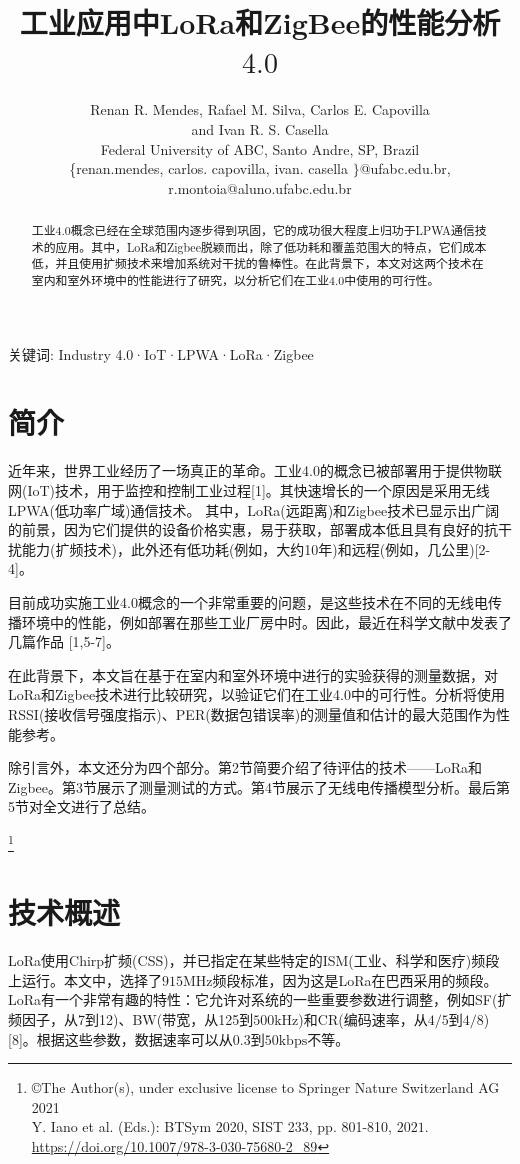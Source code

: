 \documentclass[10pt]{ctexart}
\title{工业应用中LoRa和ZigBee的性能分析 $4.0$ }
\author{Renan R. Mendes, Rafael M. Silva, Carlos E. Capovilla\\
and Ivan R. S. Casella \\
Federal University of ABC, Santo Andre, SP, Brazil\\
\{renan.mendes, carlos. capovilla, ivan. casella $\}$@ufabc.edu.br,\\
r.montoia@aluno.ufabc.edu.br}
\date{}
\begin{document}
\maketitle


\begin{abstract}
工业4.0概念已经在全球范围内逐步得到巩固，它的成功很大程度上归功于LPWA通信技术的应用。其中，LoRa和Zigbee脱颖而出，除了低功耗和覆盖范围大的特点，它们成本低，并且使用扩频技术来增加系统对干扰的鲁棒性。在此背景下，本文对这两个技术在室内和室外环境中的性能进行了研究，以分析它们在工业4.0中使用的可行性。
\end{abstract}

关键词: Industry 4.0·IoT·LPWA·LoRa·Zigbee

\section{简介}
近年来，世界工业经历了一场真正的革命。工业4.0的概念已被部署用于提供物联网(IoT)技术，用于监控和控制工业过程[1]。其快速增长的一个原因是采用无线LPWA(低功率广域)通信技术。 其中，LoRa(远距离)和Zigbee技术已显示出广阔的前景，因为它们提供的设备价格实惠，易于获取，部署成本低且具有良好的抗干扰能力(扩频技术)，此外还有低功耗(例如，大约10年)和远程(例如，几公里)[2-4]。 

目前成功实施工业4.0概念的一个非常重要的问题，是这些技术在不同的无线电传播环境中的性能，例如部署在那些工业厂房中时。因此，最近在科学文献中发表了几篇作品 [1,5-7]。

在此背景下，本文旨在基于在室内和室外环境中进行的实验获得的测量数据，对LoRa和Zigbee技术进行比较研究，以验证它们在工业4.0中的可行性。分析将使用RSSI(接收信号强度指示)、PER(数据包错误率)的测量值和估计的最大范围作为性能参考。

除引言外，本文还分为四个部分。第2节简要介绍了待评估的技术——LoRa和Zigbee。第3节展示了测量测试的方式。第4节展示了无线电传播模型分析。最后第5节对全文进行了总结。

\footnote{\copyright The Author(s), under exclusive license to Springer Nature Switzerland AG 2021\\ 
Y. Iano et al. (Eds.): BTSym 2020, SIST 233, pp. 801-810, $2021 .$\\
\href{https://doi.org/10.1007/978-3-030-75680-2_89}{https://doi.org/10.1007/978-3-030-75680-2\_89}
}

\section{技术概述}
LoRa使用Chirp扩频(CSS)，并已指定在某些特定的ISM(工业、科学和医疗)频段上运行。本文中，选择了$915\mathrm{MHz}$频段标准，因为这是LoRa在巴西采用的频段。LoRa有一个非常有趣的特性：它允许对系统的一些重要参数进行调整，例如SF(扩频因子，从7到12)、BW(带宽，从125到$500\mathrm{kHz}$)和CR(编码速率，从$4/5$到$4/8$)[8]。根据这些参数，数据速率可以从$0.3$到$50\mathrm{kbps}$不等。
\end{document}
